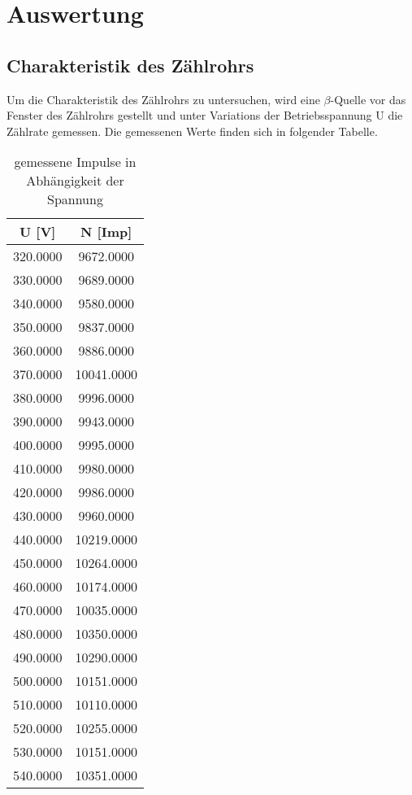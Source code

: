\section{Auswertung}
\label{sec:Auswertung}

\subsection{Charakteristik des Zählrohrs}
  Um die Charakteristik des Zählrohrs zu untersuchen, wird eine $\beta$-Quelle vor das 
  Fenster des Zählrohrs gestellt und unter Variations der Betriebsspannung U die 
  Zählrate gemessen. Die gemessenen Werte finden sich in folgender Tabelle.
  \begin{table}[H]
    \centering
    \caption{gemessene Impulse in Abhängigkeit der Spannung}
    \label{tab:data}
    \begin{tabular}{c c}
    \toprule
    U [V] & N [Imp] \\
    \midrule
    320.0000 &  9672.0000 \\   
    330.0000 &  9689.0000 \\
    340.0000 &  9580.0000 \\   
    350.0000 &  9837.0000 \\   
    360.0000 &  9886.0000 \\   
    370.0000 & 10041.0000 \\   
    380.0000 &  9996.0000 \\   
    390.0000 &  9943.0000 \\   
    400.0000 &  9995.0000 \\   
    410.0000 &  9980.0000 \\   
    420.0000 &  9986.0000 \\   
    430.0000 &  9960.0000 \\   
    440.0000 & 10219.0000 \\   
    450.0000 & 10264.0000 \\   
    460.0000 & 10174.0000 \\   
    470.0000 & 10035.0000 \\   
    480.0000 & 10350.0000 \\   
    490.0000 & 10290.0000 \\   
    500.0000 & 10151.0000 \\   
    510.0000 & 10110.0000 \\   
    520.0000 & 10255.0000 \\   
    530.0000 & 10151.0000 \\   
    540.0000 & 10351.0000 \\   

\end{tabular}
\end{table}
